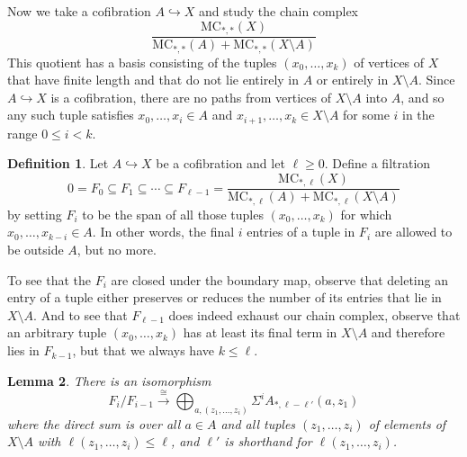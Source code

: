 \documentclass[a4paper, 11 pt, oneside, reqno]{amsart}
\newtheorem{lemma}{Lemma}
\numberwithin{lemma}{section}
\theoremstyle{definition}
\newtheorem{definition}[lemma]{Definition}
\newcommand{\MC}{\mathrm{MC}}
\begin{document}
Now we take a cofibration $A\hookrightarrow X$ 
and study the chain complex
\[
    \frac{\MC_{\ast,\ast}(X)}
    {\MC_{\ast,\ast}(A)+\MC_{\ast,\ast}(X\setminus A)}
\]
This quotient has a basis consisting of the tuples
$(x_0,\ldots,x_k)$ of vertices of $X$ that have finite length
and that do not lie entirely in $A$ or entirely in $X\setminus A$.
Since $A\hookrightarrow X$ is a cofibration,
there are no paths from vertices of $X\setminus A$
into $A$, and so any such tuple satisfies
$x_0,\ldots,x_i\in A$ and $x_{i+1},\ldots,x_k\in X\setminus A$
for some $i$ in the range $0\leq i <k$.

\begin{definition}\label{big-quotient-filtration}
    Let $A\hookrightarrow X$ be a cofibration
    and let $\ell\geq 0$.
    Define a filtration
    \[
        0 = F_0\subseteq F_1\subseteq 
        \cdots\subseteq F_{\ell-1}=
        \frac{\MC_{\ast,\ell}(X)}
        {\MC_{\ast,\ell}(A)+\MC_{\ast,\ell}(X\setminus A)}
    \]
    by setting $F_i$ to be the span of all those tuples
    $(x_0,\ldots,x_k)$ for which
    $x_0,\ldots,x_{k-i}\in A$.
    In other words, the final $i$ entries of a tuple in $F_i$
    are allowed to be outside $A$, but no more.
    
    To see that the $F_i$ are closed under the boundary map,
    observe that deleting an entry of a tuple 
    either preserves or reduces
    the number of its entries that lie in $X\setminus A$.
    And to see that $F_{\ell-1}$ does indeed exhaust 
    our chain complex, observe that an arbitrary tuple 
    $(x_0,\ldots,x_k)$ has at least its final term 
    in $X\setminus A$ and therefore lies in $F_{k-1}$,
    but that we always have $k\leq\ell$.
\end{definition}


\begin{lemma}\label{filtration-quotient-isomorphism-lemma}
    There is an isomorphism
    \[
        F_i/F_{i-1}
        \xrightarrow{\ \cong \ }
        \bigoplus_{a,(z_1,\ldots,z_i)}
        \Sigma^i A_{\ast,\ell-\ell'}(a,z_1)
    \]
    where the direct sum is over all $a\in A$ and all
    tuples $(z_1,\ldots,z_i)$ of elements of $X\setminus A$
    with $\ell(z_1,\ldots,z_i)\leq\ell$,
    and $\ell'$ is shorthand for $\ell(z_1,\ldots,z_i)$.
\end{lemma}
\end{document}
